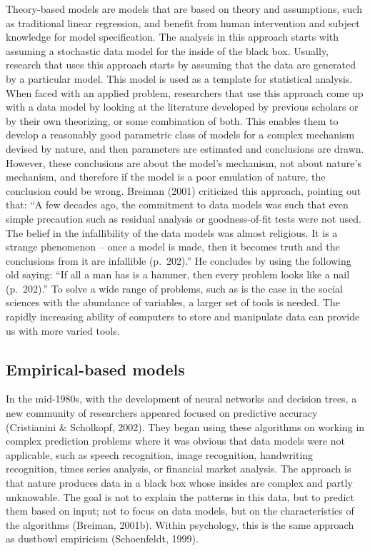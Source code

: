 \documentclass[
  man]{apa7}
\begin{document}
Theory-based models are models that are based on theory and assumptions, such as traditional linear regression, and benefit from human intervention and subject knowledge for model specification.
The analysis in this approach starts with assuming a stochastic data model for the inside of the black box.
Usually, research that uses this approach starts by assuming that the data are generated by a particular model.
This model is used as a template for statistical analysis.
When faced with an applied problem, researchers that use this approach come up with a data model by looking at the literature developed by previous scholars or by their own theorizing, or some combination of both.
This enables them to develop a reasonably good parametric class of models for a complex mechanism devised by nature, and then parameters are estimated and conclusions are drawn.
However, these conclusions are about the model's mechanism, not about nature's mechanism, and therefore if the model is a poor emulation of nature, the conclusion could be wrong.
Breiman (2001) criticized this approach, pointing out that: ``A few decades ago, the commitment to data models was such that even simple precaution such as residual analysis or goodness-of-fit tests were not used. The belief in the infallibility of the data models was almost religious. It is a strange phenomenon -- once a model is made, then it becomes truth and the conclusions from it are infallible (p.~202).'' He concludes by using the following old saying: ``If all a man has is a hammer, then every problem looks like a nail (p.~202).'' To solve a wide range of problems, such as is the case in the social sciences with the abundance of variables, a larger set of tools is needed.
The rapidly increasing ability of computers to store and manipulate data can provide us with more varied tools.

\subsection{Empirical-based models}\label{empirical-based-models}

In the mid-1980s, with the development of neural networks and decision trees, a new community of researchers appeared focused on predictive accuracy (Cristianini \& Scholkopf, 2002).
They began using these algorithms on working in complex prediction problems where it was obvious that data models were not applicable, such as speech recognition, image recognition, handwriting recognition, times series analysis, or financial market analysis.
The approach is that nature produces data in a black box whose insides are complex and partly unknowable.
The goal is not to explain the patterns in this data, but to predict them based on input; not to focus on data models, but on the characteristics of the algorithms (Breiman, 2001b).
Within psychology, this is the same approach as dustbowl empiricism (Schoenfeldt, 1999).
\end{document}
